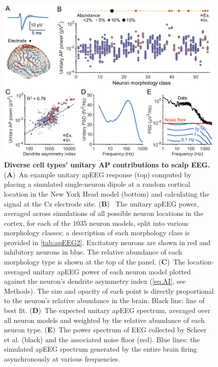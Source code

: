 \begin{figure}[t!]
    \centering
    \includegraphics[width=13.2cm]{Figures/chapter3/figure3.png}
    \caption{\textbf{Diverse cell types' unitary AP contributions to scalp EEG.} (\textbf{A})~An example unitary apEEG response (top) computed by placing a simulated single-neuron dipole at a random cortical location in the New York Head model (bottom) and calculating the signal at the Cz electrode site. (\textbf{B})~ The unitary apEEG power, averaged across simulations of all possible neuron locations in the cortex, for each of the 1035 neuron models, split into various morphology classes; a description of each morphology class is provided in \autoref{tab:apEEG2}. Excitatory neurons are shown in red and inhibitory neurons in blue. The relative abundance of each morphology type is shown at the top of the panel.  (\textbf{C})~The location-averaged unitary apEEG power of each neuron model plotted against the neuron's dendrite asymmetry index ({\ref{eq:AI}}, see Methods). The size and opacity of each point is directly proportional to the neuron's relative abundance in the brain. Black line: line of best fit. (\textbf{D})~The expected unitary apEEG spectrum, averaged over all neuron models and weighted by the relative abundance of each neuron type. (\textbf{E})~The power spectrum of EEG collected by Scheer et al. \cite{Scheer2006} (black) and the associated noise floor (red). Blue lines: the simulated apEEG spectrum generated by the entire brain firing asynchronously at various frequencies.} 
    \label{fig:uAP_spectrum}
\end{figure}

